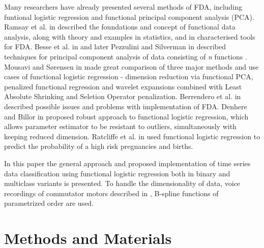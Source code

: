 \documentclass[energies,article,submit,pdftex,moreauthors]{Definitions/mdpi}
\begin{document}
Many researchers have already presented several methods of FDA, including funtional logistic regression  and functional principal component analysis (PCA). Ramsay et al. in \cite{ramsay-logreg2, ramsay1982data} described the foundations and concept of functional data analysis, along with theory and examples in statistics, and in \cite{ramsay-logreg} characterised tools for FDA. Besse et al. in  \cite{besse-pca} and later Pezzulini and Silverman in \cite{pezzulini-pca} described techniques for principal component analysis of data consisting of \textit{n} functions . Mousavi and Sørensen in  \cite{logreg-comparison} made great comparison of three major methods and use cases of functional logistic regression - dimension reduction via functional PCA, penalized functional regression and wavelet expansions combined with Least Absolute Shrinking and Seletion Operator penalization. Berrendero et al. in \cite{logreg-issues} described possible issues and problems with implementation of FDA. Denhere and Billor in \cite{denhere-robust-logreg} proposed robust approach to functional logistic regression, which allows parameter estimator to be resistant to outliers, simultaneously with keeping reduced dimension. Ratcliffe et al. in \cite{ratcliffe-pregnancies} used functional logistic regression to predict the probability of a high risk pregnancies and births. 

In this paper the general approach and proposed implementation of time series data classification using functional logistic regression both in binary and multiclass variants is presented. To handle the dimensionality of data, voice recordings of commutator motors described in \cite{ref-motors}, B-spline functions of parametrized order are used.


\section{Methods and Materials}
\end{document}
